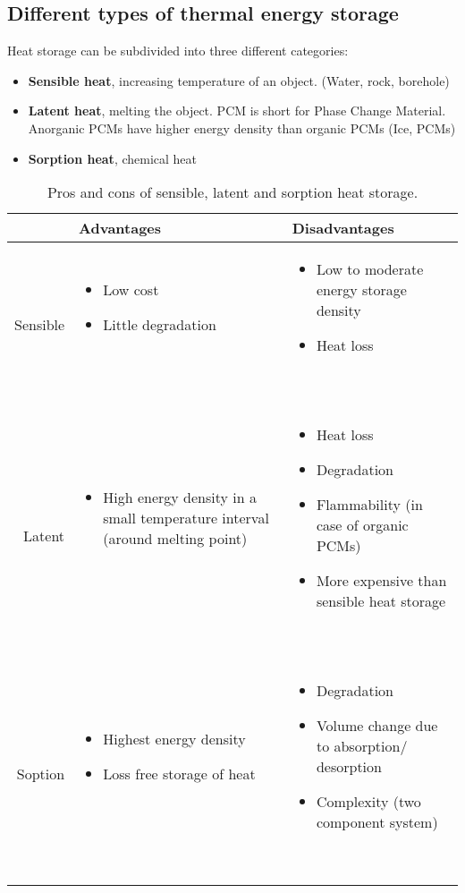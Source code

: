 \documentclass[a4paper,10pt]{article}
\begin{document}
\subsection{Different types of thermal energy storage}
\newcommand{\vb}{\vspace{-0.5cm} \begin{itemize}[noitemsep, leftmargin=0.5cm]}
\newcommand{\ve}{\end{itemize} \vspace{-0.6cm} \ }

Heat storage can be subdivided into three different categories:
\begin{itemize}
 \item \textbf{Sensible heat}, increasing temperature of an object. (Water, rock, borehole)
 \item \textbf{Latent heat}, melting the object. PCM is short for Phase Change Material. Anorganic PCMs have higher energy density than organic PCMs (Ice, PCMs)
 \item \textbf{Sorption heat}, chemical heat
\end{itemize}

\begin{table}[ht] \centering
 \begin{tabularx}{0.95\linewidth}{r XX}
  & Advantages & Disadvantages \\ \hline
  Sensible & \vb \item Low cost \item Little degradation \ve  & \vb \item Low to moderate energy storage density \item Heat loss \ve \\
  Latent   & \vb \item High energy density in a small temperature interval (around melting point) \ve & \vb \item Heat loss \item Degradation \item Flammability (in case of organic PCMs) \item More expensive than sensible heat storage \ve \\
  Soption  & \vb \item Highest energy density \item Loss free storage of heat \ve & \vb \item Degradation \item Volume change due to absorption/ desorption \item Complexity (two component system)  \ve \\ \hline
 \end{tabularx}
\caption{Pros and cons of sensible, latent and sorption heat storage.}
\end{table}
\end{document}

